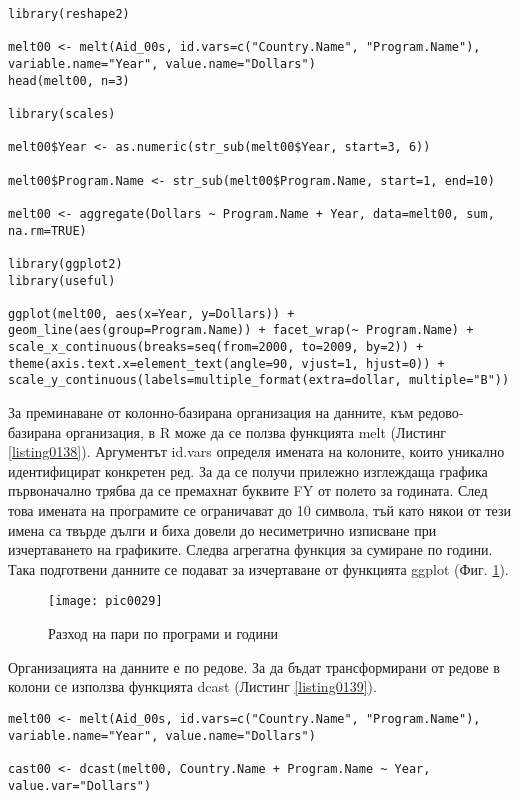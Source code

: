 \begin{lstlisting}[caption=От колони към редове, label=listing0138]
library(reshape2)

melt00 <- melt(Aid_00s, id.vars=c("Country.Name", "Program.Name"), variable.name="Year", value.name="Dollars")
head(melt00, n=3)

library(scales)

melt00$Year <- as.numeric(str_sub(melt00$Year, start=3, 6))

melt00$Program.Name <- str_sub(melt00$Program.Name, start=1, end=10)

melt00 <- aggregate(Dollars ~ Program.Name + Year, data=melt00, sum, na.rm=TRUE)

library(ggplot2)
library(useful)

ggplot(melt00, aes(x=Year, y=Dollars)) + geom_line(aes(group=Program.Name)) + facet_wrap(~ Program.Name) + scale_x_continuous(breaks=seq(from=2000, to=2009, by=2)) + theme(axis.text.x=element_text(angle=90, vjust=1, hjust=0)) + scale_y_continuous(labels=multiple_format(extra=dollar, multiple="B"))
\end{lstlisting}

За преминаване от колонно-базирана организация на данните, към редово-базирана организация, в R може да се ползва функцията melt (Листинг \ref{listing0138}). Аргументът id.vars определя имената на колоните, които уникално идентифицират конкретен ред. За да се получи прилежно изглеждаща графика първоначално трябва да се премахнат буквите FY от полето за годината. След това имената на програмите се ограничават до 10 символа, тъй като някои от тези имена са твърде дълги и биха довели до несиметрично изписване при изчертаването на графиките. Следва агрегатна функция за сумиране по години. Така подготвени данните се подават за изчертаване от функцията ggplot (Фиг. \ref{figure0029}).

\begin{figure}[h!]
  \centering
  \texttt{[image: pic0029]}
  \caption{Разход на пари по програми и години}
\label{figure0029}
\end{figure}
\FloatBarrier

Организацията на  данните е по редове. За да бъдат трансформирани от редове в колони се използва функцията dcast (Листинг \ref{listing0139}).

\begin{lstlisting}[caption=От редове към колони, label=listing0139]
melt00 <- melt(Aid_00s, id.vars=c("Country.Name", "Program.Name"), variable.name="Year", value.name="Dollars")
 
cast00 <- dcast(melt00, Country.Name + Program.Name ~ Year, value.var="Dollars")
\end{lstlisting}


